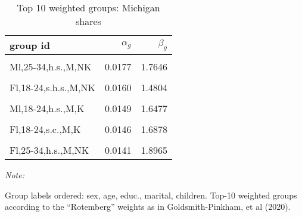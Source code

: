 \begin{table}
\centering
\caption{\label{tab:rotweights:michigan}Top 10 weighted groups: Michigan shares}
\centering
\begin{threeparttable}
\begin{tabular}[t]{lrr}
\toprule
group id & $\alpha_g$ & $\beta_g$\\
\midrule
\cellcolor{gray!10}{Ml,18-24,h.s.,M,NK} & \cellcolor{gray!10}{0.0330} & \cellcolor{gray!10}{1.5574}\\
\addlinespace
Ml,25-34,h.s.,M,NK & 0.0177 & 1.7646\\
\addlinespace
\cellcolor{gray!10}{Ml,18-24,c+,M,NK} & \cellcolor{gray!10}{0.0174} & \cellcolor{gray!10}{1.5920}\\
\addlinespace
Fl,18-24,s.h.s.,M,NK & 0.0160 & 1.4804\\
\addlinespace
\cellcolor{gray!10}{Ml,18-24,s.c.,M,NK} & \cellcolor{gray!10}{0.0155} & \cellcolor{gray!10}{1.4664}\\
\addlinespace
Ml,18-24,h.s.,M,K & 0.0149 & 1.6477\\
\addlinespace
\cellcolor{gray!10}{Fl,18-24,h.s.,M,NK} & \cellcolor{gray!10}{0.0146} & \cellcolor{gray!10}{1.6288}\\
\addlinespace
Fl,18-24,s.c.,M,K & 0.0146 & 1.6878\\
\addlinespace
\cellcolor{gray!10}{Ml,35-49,s.c.,M,NK} & \cellcolor{gray!10}{0.0146} & \cellcolor{gray!10}{1.4254}\\
\addlinespace
Fl,25-34,h.s.,M,NK & 0.0141 & 1.8965\\
\bottomrule
\end{tabular}
\begin{tablenotes}
\item \textit{Note: } 
\item Group labels ordered: sex, age, educ., marital, children. Top-10 weighted groups according to the ``Rotemberg'' weights as in Goldsmith-Pinkham, et al (2020).
\end{tablenotes}
\end{threeparttable}
\end{table}

